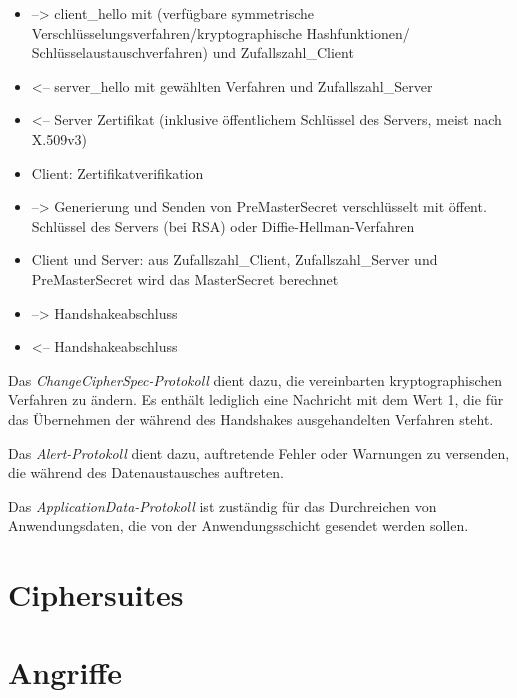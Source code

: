 \documentclass[
    12pt,
    headings=small,
    parskip=half,           %
    bibliography=totoc,
    numbers=noenddot,       %
    open=any,               %
    ]{scrreprt}
\begin{document}
\begin{itemize}
\item --> client\_hello mit (verfügbare symmetrische Verschlüsselungsverfahren/kryptographische Hashfunktionen/ Schlüsselaustauschverfahren) und Zufallszahl\_Client

\item <-- server\_hello mit gewählten Verfahren und Zufallszahl\_Server

\item <-- Server Zertifikat (inklusive öffentlichem Schlüssel des Servers, meist nach X.509v3)

\item Client: Zertifikatverifikation

\item --> Generierung und Senden von PreMasterSecret verschlüsselt mit öffent. Schlüssel des Servers (bei RSA) oder Diffie-Hellman-Verfahren

\item Client und Server: aus Zufallszahl\_Client, Zufallszahl\_Server und PreMasterSecret wird das MasterSecret berechnet

\item --> Handshakeabschluss 

\item <-- Handshakeabschluss
\end{itemize}


Das \emph{ChangeCipherSpec-Protokoll} dient dazu, die vereinbarten kryptographischen Verfahren zu ändern. Es enthält lediglich eine Nachricht mit dem Wert 1, die für das Übernehmen der während des Handshakes ausgehandelten Verfahren steht. \cite{eckert13}

Das \emph{Alert-Protokoll} dient dazu, auftretende Fehler oder Warnungen zu versenden, die während des Datenaustausches auftreten. 

Das \emph{ApplicationData-Protokoll} ist zuständig für das Durchreichen von Anwendungsdaten, die von der Anwendungsschicht gesendet werden sollen.\cite{Schneier2006}

\chapter{Ciphersuites}

\chapter{Angriffe}



\end{document}
